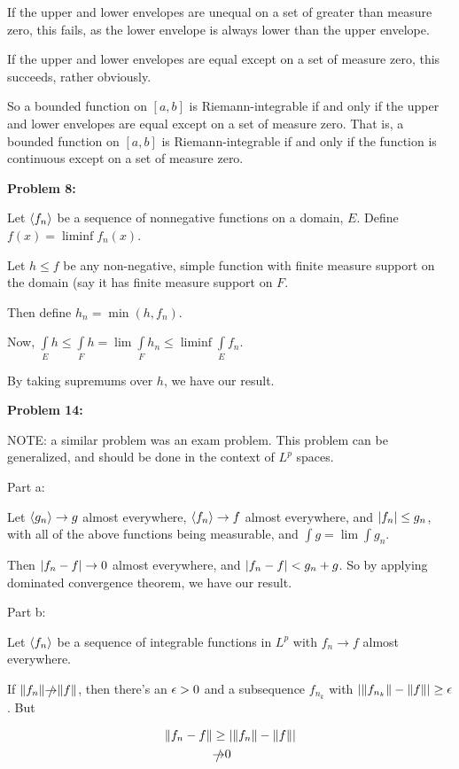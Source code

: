 \documentclass[a4paper,12pt]{article}
\begin{document}
If the upper and lower envelopes are unequal on a set of greater than measure zero, this fails, as the lower envelope is always lower than the upper envelope.

If the upper and lower envelopes are equal except on a set of measure zero, this succeeds, rather obviously.

So a bounded function on $[a,b]$ is Riemann-integrable if and only if the upper and lower envelopes are equal except on a set of measure zero. That is, a bounded function on $[a,b]$ is Riemann-integrable if and only if the function is continuous except on a set of measure zero.

\shunt

{\bf Problem 8:}

Let $\left\langle f_n \right\rangle$ be a sequence of nonnegative functions on a domain, $E$. Define $f(x) = \liminf f_n(x)$.

Let $h \leq f$ be any non-negative, simple function with finite measure support on the domain (say it has finite measure support on $F$. 

Then define $h_n = \min(h,f_n)$.

Now, $\int\limits_E h \leq \int\limits_F h= \lim \int\limits_F h_n \leq \liminf \int\limits_E f_n$.

By taking supremums over $h$, we have our result.

\shunt

{\bf Problem 14:}

NOTE: a similar problem was an exam problem. This problem can be generalized, and should be done in the context of $L^p$ spaces.

Part a:

Let $\left\langle g_n \right\rangle \to g$ almost everywhere, $\left\langle f_n \right\rangle \to f$ almost everywhere, and $\left\lvert f_n \right\rvert \leq g_n$, with all of the above functions being measurable, and $\int g = \lim \int g_n$.

Then $\left\lvert f_n - f \right\rvert \to 0$ almost everywhere, and $\left\lvert f_n-f \right\rvert < g_n+g$. So by applying dominated convergence theorem, we have our result.

\shunt

Part b: 

Let $\left\langle f_n \right\rangle$ be a sequence of integrable functions in $L^p$ with $f_n \to f$ almost everywhere.

If $\|f_n\| \slashed{\to} \|f\|$, then there's an $\epsilon >0$ and a subsequence $f_{n_k}$ with $\left\lvert \|f_{n_k}\| - \|f\| \right\rvert \geq \epsilon$. But

\begin{align*}
\|f_n - f\| &\geq \left\lvert \|f_n\| - \|f\| \right\rvert\\
&\slashed{\to} 0
\end{align*}
\end{document}
